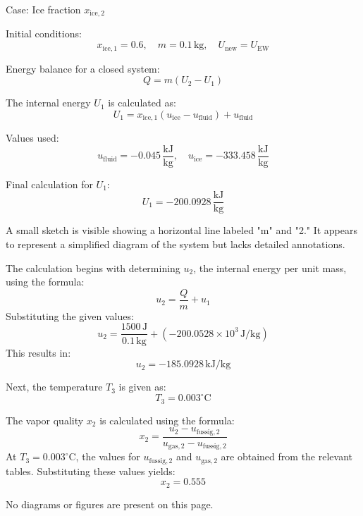 Case: Ice fraction \( x_{\text{ice},2} \)  

Initial conditions:  
\[
x_{\text{ice},1} = 0.6, \quad m = 0.1 \, \text{kg}, \quad U_{\text{new}} = U_{\text{EW}}
\]  

Energy balance for a closed system:  
\[
Q = m (U_2 - U_1)
\]  

The internal energy \( U_1 \) is calculated as:  
\[
U_1 = x_{\text{ice},1} (u_{\text{ice}} - u_{\text{fluid}}) + u_{\text{fluid}}
\]  

Values used:  
\[
u_{\text{fluid}} = -0.045 \, \frac{\text{kJ}}{\text{kg}}, \quad u_{\text{ice}} = -333.458 \, \frac{\text{kJ}}{\text{kg}}
\]  

Final calculation for \( U_1 \):  
\[
U_1 = -200.0928 \, \frac{\text{kJ}}{\text{kg}}
\]  

A small sketch is visible showing a horizontal line labeled "m" and "2." It appears to represent a simplified diagram of the system but lacks detailed annotations.

The calculation begins with determining \( u_2 \), the internal energy per unit mass, using the formula:  
\[
u_2 = \frac{Q}{m} + u_1
\]  
Substituting the given values:  
\[
u_2 = \frac{1500 \, \text{J}}{0.1 \, \text{kg}} + (-200.0528 \times 10^3 \, \text{J/kg})
\]  
This results in:  
\[
u_2 = -185.0928 \, \text{kJ/kg}
\]  

Next, the temperature \( T_3 \) is given as:  
\[
T_3 = 0.003^\circ \text{C}
\]  

The vapor quality \( x_2 \) is calculated using the formula:  
\[
x_2 = \frac{u_2 - u_{\text{fussig},2}}{u_{\text{gas},2} - u_{\text{fussig},2}}
\]  
At \( T_3 = 0.003^\circ \text{C} \), the values for \( u_{\text{fussig},2} \) and \( u_{\text{gas},2} \) are obtained from the relevant tables. Substituting these values yields:  
\[
x_2 = 0.555
\]  

No diagrams or figures are present on this page.